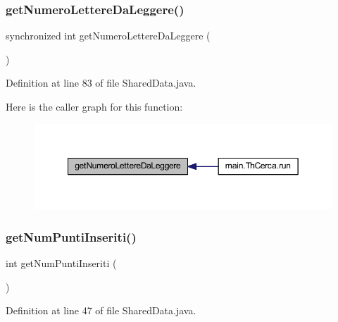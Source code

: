 \subsubsection{\texorpdfstring{get\+Numero\+Lettere\+Da\+Leggere()}{getNumeroLettereDaLeggere()}}
{\footnotesize\ttfamily synchronized int get\+Numero\+Lettere\+Da\+Leggere (\begin{DoxyParamCaption}{ }\end{DoxyParamCaption})}



Definition at line 83 of file Shared\+Data.\+java.

Here is the caller graph for this function\+:
\nopagebreak
\begin{figure}[H]
\begin{center}
\leavevmode
\includegraphics[width=349pt]{classmain_1_1_shared_data_a560577008f849ccb788cc398fce280d1_icgraph}
\end{center}
\end{figure}
\mbox{\label{classmain_1_1_shared_data_a605b5ca567b3e27a318d25b422eaf0a8}} 
\subsubsection{\texorpdfstring{get\+Num\+Punti\+Inseriti()}{getNumPuntiInseriti()}}
{\footnotesize\ttfamily int get\+Num\+Punti\+Inseriti (\begin{DoxyParamCaption}{ }\end{DoxyParamCaption})}



Definition at line 47 of file Shared\+Data.\+java.

